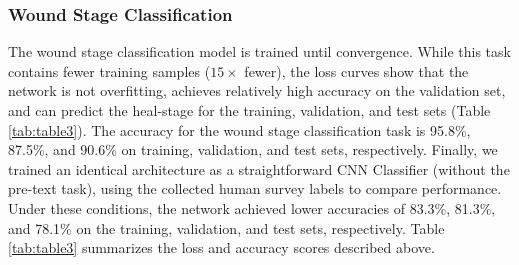 \documentclass[11pt]{ucthesis}
\begin{document}

\subsubsection{Wound Stage Classification}
The wound stage classification model is trained until convergence. While this task contains fewer training samples ($15\times$ fewer), the loss curves show that the network is not overfitting, achieves relatively high accuracy on the validation set, and can predict the heal-stage for the training, validation, and test sets (Table \ref{tab:table3}). The accuracy for the wound stage classification task is 95.8\%, 87.5\%, and 90.6\% on training, validation, and test sets, respectively. Finally, we trained an identical architecture as a straightforward CNN Classifier (without the pre-text task), using the collected human survey labels to compare performance. Under these conditions, the network achieved lower accuracies of 83.3\%, 81.3\%, and 78.1\% on the training, validation, and test sets, respectively. Table \ref{tab:table3} summarizes the loss and accuracy scores described above.
\end{document}
